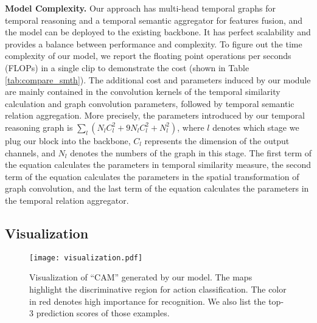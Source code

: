 \documentclass[conference,compsoc]{IEEEtran}
\begin{document}
    \noindent\textbf{Model Complexity.}
    Our approach has multi-head temporal graphs for temporal reasoning and a temporal semantic aggregator for features fusion, and the model can be deployed to the existing backbone. It has perfect scalability and provides a balance between performance and complexity. To figure out the time complexity of our model, we report the floating point operations per seconds (FLOPs) in a single clip to demonstrate the cost (shown in Table \ref{tab:compare_smth}). The additional cost and parameters induced by our module are mainly contained in the convolution kernels of the temporal similarity calculation and graph convolution parameters, followed by temporal semantic relation aggregation. More precisely, the parameters introduced by our temporal reasoning graph is $\sum_{l}\left(N_{l} C_{l}^{2}+9 N_{l} C_{l}^{2}+N_{l}^{2}\right)$, where $l$ denotes which stage we plug our block into the backbone, $C_{l}$ represents the dimension of the output channels, and $N_{l}$ denotes the numbers of the graph in this stage. The first term of the equation calculates the parameters in temporal similarity measure, the second term of the equation calculates the parameters in the spatial transformation of graph convolution, and the last term of the equation calculates the parameters in the temporal relation aggregator.
    
\subsection{Visualization}

    \begin{figure*}[h]
    \centering
        \texttt{[image: visualization.pdf]}
        \caption{Visualization of ``CAM'' \cite{zhou2016learning} generated by our model. The maps highlight the discriminative region for action classification. The color in red denotes high importance for recognition. We also list the top-3 prediction scores of those examples.}
        \label{fig:cam}
    \end{figure*}
\end{document}
